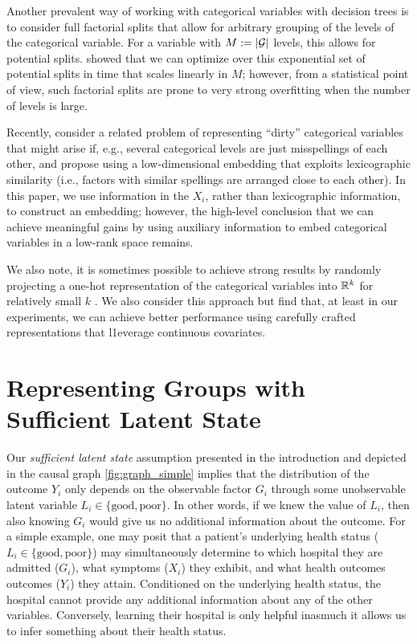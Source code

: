 \documentclass{article}
\theoremstyle{plain}
\theoremstyle{definition}
\theoremstyle{remark}
\begin{document}
Another prevalent way of working with categorical variables with decision trees
is to consider full factorial splits that allow for arbitrary grouping of the levels of the categorical
variable. For a variable with $M := \left\lvert\mathcal{G}\right\rvert$ levels, this allows
for  potential splits. \citet{breiman1984classification} showed that
we can optimize over this exponential set of potential splits in time that scales linearly in $M$;
however, from a statistical point of view, such factorial splits are prone to very strong overfitting
when the number of levels is large.

Recently, \citet{cerda2018similarity} consider a related problem of representing ``dirty'' categorical
variables that might arise if, e.g., several categorical levels are just misspellings of each other, and
propose using a low-dimensional embedding that exploits lexicographic similarity (i.e., factors with
similar spellings are arranged close to each other). In this paper, we use information in the $X_i$,
rather than lexicographic information, to construct an embedding; however, the high-level conclusion
that we can achieve meaningful gains by using auxiliary information to embed categorical variables in
a low-rank space remains.

We also note, it is sometimes possible to achieve strong results by randomly projecting a one-hot
representation of the categorical variables into $\mathbb{R}^k$ for relatively small $k$ \citep{rahimi2008random}. We also
consider this approach but find that, at least in our experiments, we can achieve better
performance using carefully crafted representations that l1everage continuous covariates.








\section{Representing Groups with Sufficient Latent State}

Our \emph{sufficient latent state} assumption presented in the introduction and depicted in the causal graph \ref{fig:graph_simple} implies that the distribution of the outcome $Y_{i}$ only depends on the observable factor $G_{i}$ through some unobservable latent variable $L_{i} \in \{\text{good}, \text{poor} \}$. In other words, if we knew the value of $L_{i}$, then also knowing $G_{i}$ would give us no additional information about the outcome. For a simple example, one may posit that a patient's underlying health status ($L_{i} \in \{\text{good}, \text{poor}\}$) may simultaneously determine to which hospital they are admitted ($G_{i}$), what symptoms ($X_i$) they exhibit, and what health outcomes outcomes ($Y_i$) they attain. Conditioned on the underlying health status, the hospital cannot provide any additional information about any of the other variables. Conversely, learning their hospital is only helpful inasmuch it allows us to infer something about their health status.
\end{document}
